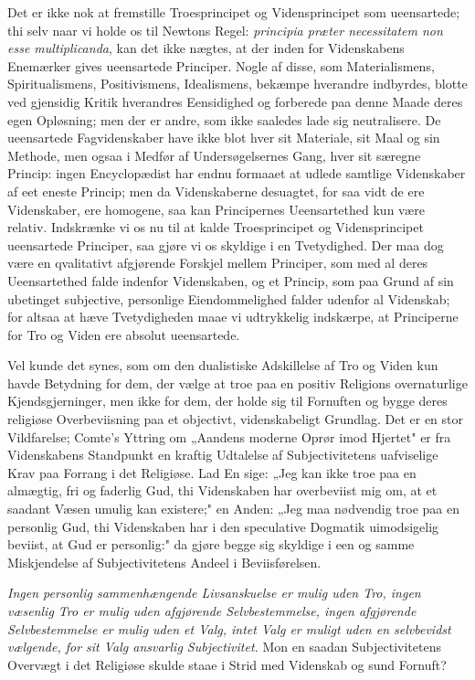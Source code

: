 \documentclass[12pt]{article}
\newcommand{\opage}[1]{\marginnote{\footnotesize\textit{[#1]}}}
\begin{document}
Det er ikke nok at fremstille Troesprincipet og Vidensprincipet som
ueensartede; thi selv naar vi holde os til Newtons Regel:
\textit{principia præter necessitatem non esse multiplicanda}, kan det
ikke nægtes, at der inden for Videnskabens Enemærker gives ueensartede
Principer. Nogle af disse, som Materialismens, Spiritualismens,
Positivismens, Idealismens, bekæmpe hverandre indbyrdes, blotte ved
gjensidig Kritik hverandres Eensidighed og forberede paa denne Maade
deres egen Opløsning; men der er andre, som ikke saaledes lade sig
neutralisere. De ueensartede Fagvidenskaber have ikke blot hver sit
Materiale, sit Maal og sin Methode, men ogsaa i Medfør af
Undersøgelsernes Gang, hver sit særegne Princip: ingen Encyclopædist
har endnu formaaet at udlede samtlige Videnskaber af eet eneste
Princip; men da Videnskaberne desuagtet, for saa vidt de ere
Videnskaber, ere homogene, saa kan Principernes Ueensartethed kun være
relativ. Indskrænke vi os nu til at kalde Troesprincipet og
Vidensprincipet ueensartede Principer, saa gjøre vi os skyldige i en
Tvetydighed. Der maa dog være en qvalitativt afgjørende Forskjel mellem
Principer, som med al deres Ueensartethed falde indenfor Videnskaben,
og et Princip, som paa Grund af sin ubetinget subjective, personlige
Eiendommelighed falder udenfor
\opage{72} al Videnskab; for altsaa at hæve Tvetydigheden maae vi udtrykkelig
indskærpe, at Principerne for Tro og Viden ere absolut ueensartede.

Vel kunde det synes, som om den dualistiske Adskillelse af Tro og Viden
kun havde Betydning for dem, der vælge at troe paa en positiv Religions
overnaturlige Kjendsgjerninger, men ikke for dem, der holde sig til
Fornuften og bygge deres religiøse Overbeviisning paa et objectivt,
videnskabeligt Grundlag. Det er en stor Vildfarelse; Comte's Yttring om
„Aandens moderne Oprør imod Hjertet" er fra Videnskabens Standpunkt en
kraftig Udtalelse af Subjectivitetens uafviselige Krav paa Forrang i
det Religiøse. Lad En sige: „Jeg kan ikke troe paa en almægtig, fri og
faderlig Gud, thi Videnskaben har overbeviist mig om, at et saadant
Væsen umulig kan existere;" en Anden: „Jeg maa nødvendig troe paa en
personlig Gud, thi Videnskaben har i den speculative Dogmatik
uimodsigelig beviist, at Gud er personlig:" da gjøre begge sig skyldige
i een og samme Miskjendelse af Subjectivitetens Andeel i
Beviisførelsen.

\emph{Ingen personlig sammenhængende Livsanskuelse er mulig uden Tro,
ingen væsenlig Tro er mulig uden afgjørende Selvbestemmelse, ingen
afgjørende Selvbestemmelse er mulig uden et Valg, intet Valg er muligt
uden en selvbevidst vælgende, for sit Valg ansvarlig Subjectivitet.}
Mon en saadan Subjectivitetens Overvægt i det Religiøse skulde staae i
Strid med Videnskab og sund Fornuft?
\end{document}
